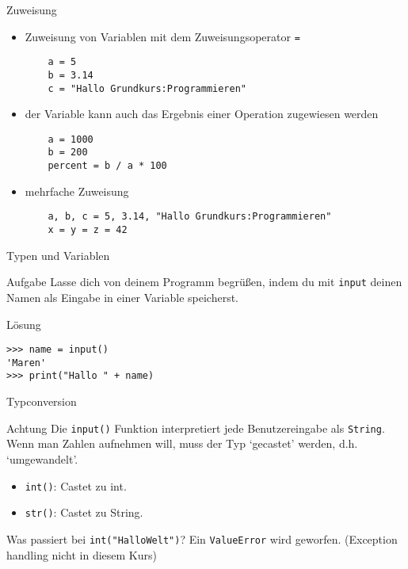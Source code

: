 \begin{frame}[fragile]{Zuweisung}
\begin{itemize}
	\item Zuweisung von Variablen mit dem Zuweisungsoperator \texttt{=}
	\begin{lstlisting}
	a = 5
	b = 3.14
	c = "Hallo Grundkurs:Programmieren"
	\end{lstlisting}
	\item der Variable kann auch das Ergebnis einer Operation zugewiesen werden
	\begin{lstlisting}
	a = 1000
	b = 200
	percent = b / a * 100
	\end{lstlisting}
	\item mehrfache Zuweisung 
	\begin{lstlisting}
	a, b, c = 5, 3.14, "Hallo Grundkurs:Programmieren"
	x = y = z = 42
	\end{lstlisting}
\end{itemize}
\end{frame}

\begin{frame}[fragile]{Typen und Variablen}
   
    \begin{block}{Aufgabe}
       Lasse dich von deinem Programm begrüßen, indem du mit \texttt{input} deinen Namen als  
       Eingabe in einer Variable speicherst.
    \end{block}
    \pause{}
    \begin{exampleblock}{Lösung}
        \begin{lstlisting}
>>> name = input()
'Maren'
>>> print("Hallo " + name)
        \end{lstlisting}
    \end{exampleblock}
\end{frame}

\begin{frame}[fragile]{Typconversion}
    \begin{alertblock}{Achtung}
    Die \lstinline{input()} Funktion interpretiert jede Benutzereingabe
    als \texttt{String}. Wenn man Zahlen aufnehmen will, muss der Typ
    `gecastet' werden, d.h. `umgewandelt'.
    \begin{itemize}
        \item \lstinline{int()}: Castet zu int.
        \item \lstinline{str()}: Castet zu String.
    \end{itemize}
    Was passiert bei \lstinline{int("HalloWelt")}?
    \pause{}
    Ein \texttt{ValueError} wird geworfen. (Exception handling nicht 
    in diesem Kurs)
    \end{alertblock}
\end{frame}

